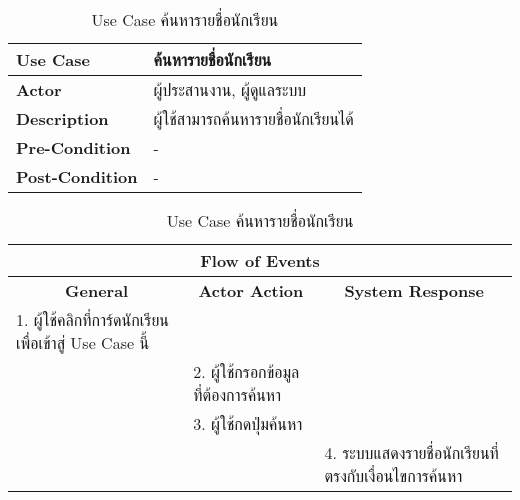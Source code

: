 \begin{table}[H]
    \caption{Use Case ค้นหารายชื่อนักเรียน}
    \label{tab:use-case-search-student}
    \begin{tabularx}{\textwidth}{ | p{3cm} | X | }
    \hline
    \textbf{Use Case} & ค้นหารายชื่อนักเรียน \\
    \hline
    \textbf{Actor} & ผู้ประสานงาน, ผู้ดูแลระบบ \\
    \hline
    \textbf{Description} & ผู้ใช้สามารถค้นหารายชื่อนักเรียนได้ \\
    \hline
    \textbf{Pre-Condition} & - \\
    \hline
    \textbf{Post-Condition} & - \\
    \hline
    \end{tabularx}
    \begin{tabularx}{\textwidth}{ | X | X | X | }
    \multicolumn{3}{|c|}{\textbf{Flow of Events}} \\
    \hline
    \multicolumn{1}{|c|}{\textbf{General}} & \multicolumn{1}{|c|}{\textbf{Actor Action}} & \multicolumn{1}{|c|}{\textbf{System Response}} \\
    \hline
    1. ผู้ใช้คลิกที่การ์ดนักเรียนเพื่อเข้าสู่ Use Case นี้ &  &  \\
    \hline
    & 2. ผู้ใช้กรอกข้อมูลที่ต้องการค้นหา & \\
    \hline
    & 3. ผู้ใช้กดปุ่มค้นหา &  \\
    \hline
    & & 4. ระบบแสดงรายชื่อนักเรียนที่ตรงกับเงื่อนไขการค้นหา \\
    \hline
    \end{tabularx}
\end{table}
